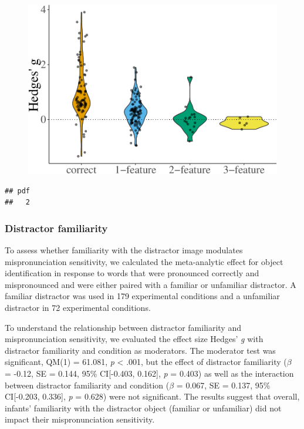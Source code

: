\documentclass[man]{apa6}
\theoremstyle{definition}
\theoremstyle{definition}
\theoremstyle{definition}
\theoremstyle{remark}
\begin{document}
\begin{figure}
\centering
\includegraphics{VonHolzenBergmann_MPMetaAnalysis_files/figure-latex/PlotFeatEffect-1.pdf}
\caption{}
\end{figure}

\begin{verbatim}
## pdf 
##   2
\end{verbatim}

\subsubsection{Distractor familiarity}\label{distractor-familiarity}

To assess whether familiarity with the distractor image modulates
mispronunciation sensitivity, we calculated the meta-analytic effect for
object identification in response to words that were pronounced
correctly and mispronounced and were either paired with a familiar or
unfamiliar distractor. A familiar distractor was used in 179
experimental conditions and a unfamiliar distractor in 72 experimental
conditions.

To understand the relationship between distractor familiarity and
mispronunciation sensitivity, we evaluated the effect size Hedges'
\emph{g} with distractor familiarity and condition as moderators. The
moderator test was significant, QM(1) = 61.081, \emph{p} \textless{}
.001, but the effect of distractor familiarity (\(\beta\) = -0.12, SE =
0.144, 95\% CI{[}-0.403, 0.162{]}, \emph{p} = 0.403) as well as the
interaction between distractor familiarity and condition (\(\beta\) =
0.067, SE = 0.137, 95\% CI{[}-0.203, 0.336{]}, \emph{p} = 0.628) were
not significant. The results suggest that overall, infants' familiarity
with the distractor object (familiar or unfamiliar) did not impact their
mispronunciation sensitivity.
\end{document}
